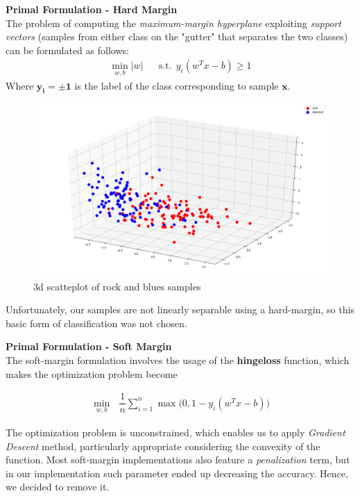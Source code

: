 \documentclass[12pt]{article}
\begin{document}
	\textbf{Primal Formulation - Hard Margin}\\
	The problem of computing the \textit{maximum-margin hyperplane} exploiting \textit{support vectors} (samples from either class on the "gutter" that separates the two classes) can be formulated as follows:\\
	\begin{align}
		\min_{w,b} |w| &&
		\text{s.t.}\ \ y_i(w^Tx-b)\ge 1
	\end{align} 
	Where $\mathbf{y_i =\pm 1}$ is the label of the class corresponding to sample $\mathbf{x}$.\\
	
	\begin{figure}[H]
		\hspace{120pt}\includegraphics[scale=0.2]{exp1_legend}
		\caption{3d scatteplot of rock and blues samples}
	\end{figure}
	
	Unfortunately, our samples are not linearly separable using a hard-margin, so this basic form of classification was not chosen.\newline
	
	\textbf{Primal Formulation - Soft Margin}\\
	The soft-margin formulation involves the usage of the \textbf{hingeloss} function, which makes the optimization problem become
	
	\begin{align}
		\min_{w,b}\ \ \ \dfrac {1}{n} \sum_{i=1}^n{\max{\Big(0,1-y_i(w^Tx-b)\Big)}}
	\end{align}

	The optimization problem is unconstrained, which enables us to apply \textit{Gradient Descent} method, particularly appropriate considering the convexity of the function. Most soft-margin implementations also feature a \textit{penalization} term, but in our implementation such parameter ended up decreasing the accuracy. Hence, we decided to remove it.
	
\end{document}
